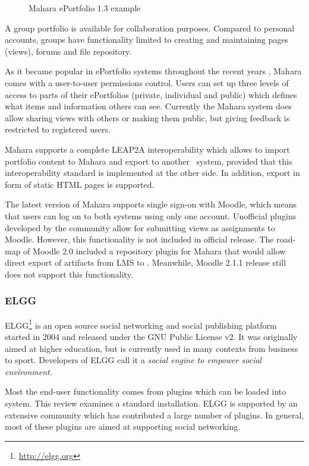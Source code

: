 \begin{figure}[htb]
\centering
\setlength\fboxsep{0pt}
\setlength\fboxrule{0.5pt}
\caption{Mahara ePortfolio 1.3 example}
\label{fig:maharaep}
\end{figure}

A group portfolio is available for collaboration purposes. Compared to personal
accounts, groups have functionality limited to creating and maintaining pages
(views), forums and file repository.

As it became popular in ePortfolio systems throughout the recent years
\citep{Waters2009}, Mahara comes with a user-to-user permissions control. Users
can set up three levels of access to parts of their ePortfolios (private,
individual and public) which defines what items and information others can see.
Currently the Mahara system does allow sharing views with others or making them
public, but giving feedback is restricted to registered users.

Mahara supports a complete LEAP2A interoperability which allows to import
portfolio content to Mahara and export to another \ep~system, provided that
this interoperability standard is implemented at the other side. In addition,
export in form of static HTML pages is supported.

The latest version of Mahara supports single sign-on with Moodle, which means
that users can log on to both systems using only one account. Unofficial plugins
developed by the community allow for submitting views as assignments to Moodle.
However, this functionality is not included in official release. The road-map of
Moodle 2.0 included a repository plugin for Mahara that would allow direct
export of artifacts from LMS to \ep. Meanwhile, Moodle 2.1.1 release still does
not support this functionality.

\subsubsection{ELGG}
ELGG\footnote{\url{http://elgg.org}} is an open source social networking and
social publishing platform started in 2004 and released under the GNU Public
License v2. It was originally aimed at higher education, but is currently used
in many contexts from business to sport. Developers of ELGG call it a
\textit{social engine to empower social environment}.

Most the end-user functionality comes from plugins which can be loaded into
system. This review examines a standard installation. ELGG is supported by an
extensive community which has contributed a large number of plugins. In
general, most of these plugins are aimed at supporting social networking.

